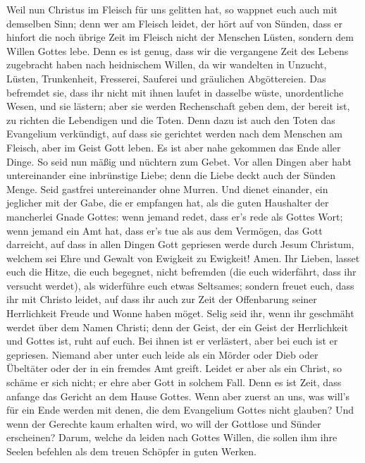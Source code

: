  Weil nun Christus im Fleisch für uns gelitten hat, so
wappnet euch auch mit demselben Sinn; denn wer am Fleisch leidet, der
hört auf von Sünden,  dass er hinfort die noch übrige Zeit
im Fleisch nicht der Menschen Lüsten, sondern dem Willen Gottes lebe.
 Denn es ist genug, dass wir die vergangene Zeit des
Lebens zugebracht haben nach heidnischem Willen, da wir wandelten in
Unzucht, Lüsten, Trunkenheit, Fresserei, Sauferei und gräulichen
Abgöttereien.  Das befremdet sie, dass ihr nicht mit ihnen
laufet in dasselbe wüste, unordentliche Wesen, und sie lästern;
 aber sie werden Rechenschaft geben dem, der bereit ist,
zu richten die Lebendigen und die Toten.  Denn dazu ist
auch den Toten das Evangelium verkündigt, auf dass sie gerichtet werden
nach dem Menschen am Fleisch, aber im Geist Gott leben. 
Es ist aber nahe gekommen das Ende aller Dinge.  So seid
nun mäßig und nüchtern zum Gebet. Vor allen Dingen aber habt
untereinander eine inbrünstige Liebe; denn die Liebe deckt auch der
Sünden Menge.  Seid gastfrei untereinander ohne Murren.
 Und dienet einander, ein jeglicher mit der Gabe, die er
empfangen hat, als die guten Haushalter der mancherlei Gnade Gottes:
 wenn jemand redet, dass er's rede als Gottes Wort; wenn
jemand ein Amt hat, dass er's tue als aus dem Vermögen, das Gott
darreicht, auf dass in allen Dingen Gott gepriesen werde durch Jesum
Christum, welchem sei Ehre und Gewalt von Ewigkeit zu Ewigkeit! Amen.
 Ihr Lieben, lasset euch die Hitze, die euch begegnet,
nicht befremden (die euch widerfährt, dass ihr versucht werdet), als
widerführe euch etwas Seltsames;  sondern freuet euch,
dass ihr mit Christo leidet, auf dass ihr auch zur Zeit der Offenbarung
seiner Herrlichkeit Freude und Wonne haben möget.  Selig
seid ihr, wenn ihr geschmäht werdet über dem Namen Christi; denn der
Geist, der ein Geist der Herrlichkeit und Gottes ist, ruht auf euch. Bei
ihnen ist er verlästert, aber bei euch ist er gepriesen. 
Niemand aber unter euch leide als ein Mörder oder Dieb oder Übeltäter
oder der in ein fremdes Amt greift.  Leidet er aber als
ein Christ, so schäme er sich nicht; er ehre aber Gott in solchem Fall.
 Denn es ist Zeit, dass anfange das Gericht an dem Hause
Gottes. Wenn aber zuerst an uns, was will's für ein Ende werden mit
denen, die dem Evangelium Gottes nicht glauben?  Und wenn
der Gerechte kaum erhalten wird, wo will der Gottlose und Sünder
erscheinen?  Darum, welche da leiden nach Gottes Willen,
die sollen ihm ihre Seelen befehlen als dem treuen Schöpfer in guten
Werken.

